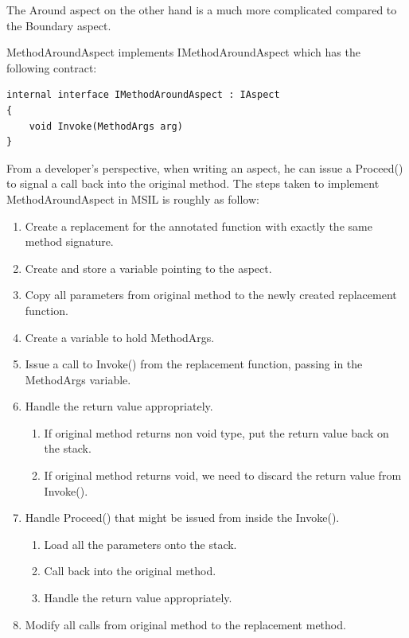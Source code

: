The Around aspect on the other hand is a much more complicated compared to the Boundary aspect.

MethodAroundAspect implements IMethodAroundAspect which has the following contract:

\begin{lstlisting}[caption={IMethodAroundAspect Contract}, label=aroundcontract]
internal interface IMethodAroundAspect : IAspect
{
	void Invoke(MethodArgs arg)
}
\end{lstlisting}

From a developer’s perspective, when writing an aspect, he can issue a Proceed() to signal a call back into the original method. The steps taken to implement MethodAroundAspect in MSIL is roughly as follow:

\begin{enumerate}
	\item Create a replacement for the annotated function with exactly the same method signature.
	\item Create and store a variable pointing to the aspect.
	\item Copy all parameters from original method to the newly created replacement function.
	\item Create a variable to hold MethodArgs.
	\item Issue a call to Invoke() from the replacement function, passing in the MethodArgs variable.
	\item Handle the return value appropriately.
	\begin{enumerate}
		\item If original method returns non void type, put the return value back on the stack.
		\item If original method returns void, we need to discard the return value from Invoke().
	\end{enumerate}
	\item Handle Proceed() that might be issued from inside the Invoke().
	\begin{enumerate}
		\item Load all the parameters onto the stack.
		\item Call back into the original method.
		\item Handle the return value appropriately.
	\end{enumerate}
	\item Modify all calls from original method to the replacement method.
\end{enumerate}

